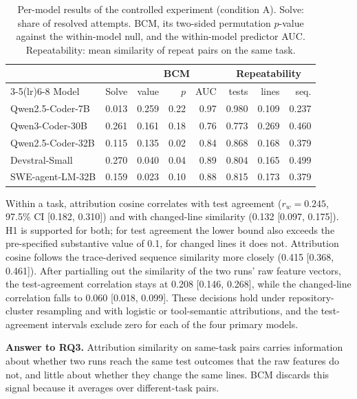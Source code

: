 \documentclass[conference]{IEEEtran}
\newcommand{\bcm}{\textsc{BCM}}
\begin{document}
\begin{table}[t]
\centering
\caption{Per-model results of the controlled experiment (condition A). Solve: share of resolved attempts. \bcm{}, its two-sided permutation $p$-value against the within-model null, and the within-model predictor AUC. Repeatability: mean similarity of repeat pairs on the same task.}
\label{tab:permodel}
\footnotesize
\setlength{\tabcolsep}{2.4pt}
\begin{tabular}{lrrrrrrr}
\toprule
 & & \multicolumn{3}{c}{\bcm} & \multicolumn{3}{c}{Repeatability}\\
\cmidrule(lr){3-5}\cmidrule(lr){6-8}
Model & Solve & value & $p$ & AUC & tests & lines & seq.\\
\midrule
Qwen2.5-Coder-7B & 0.013 & 0.259 & 0.22 & 0.97 & 0.980 & 0.109 & 0.237\\
Qwen3-Coder-30B & 0.261 & 0.161 & 0.18 & 0.76 & 0.773 & 0.269 & 0.460\\
Qwen2.5-Coder-32B & 0.115 & 0.135 & 0.02 & 0.84 & 0.868 & 0.168 & 0.379\\
Devstral-Small & 0.270 & 0.040 & 0.04 & 0.89 & 0.804 & 0.165 & 0.499\\
SWE-agent-LM-32B & 0.159 & 0.023 & 0.10 & 0.88 & 0.815 & 0.173 & 0.379\\
\bottomrule
\end{tabular}
\end{table}

Within a task, attribution cosine correlates with test agreement ($r_w=0.245$, 97.5\% CI [0.182, 0.310]) and with changed-line similarity (0.132 [0.097, 0.175]). H1 is supported for both; for test agreement the lower bound also exceeds the pre-specified substantive value of 0.1, for changed lines it does not. Attribution cosine follows the trace-derived sequence similarity more closely (0.415 [0.368, 0.461]). After partialling out the similarity of the two runs' raw feature vectors, the test-agreement correlation stays at 0.208 [0.146, 0.268], while the changed-line correlation falls to 0.060 [0.018, 0.099]. These decisions hold under repository-cluster resampling and with logistic or tool-semantic attributions, and the test-agreement intervals exclude zero for each of the four primary models.

\textbf{Answer to RQ3.} Attribution similarity on same-task pairs carries information about whether two runs reach the same test outcomes that the raw features do not, and little about whether they change the same lines. \bcm{} discards this signal because it averages over different-task pairs.
\end{document}
